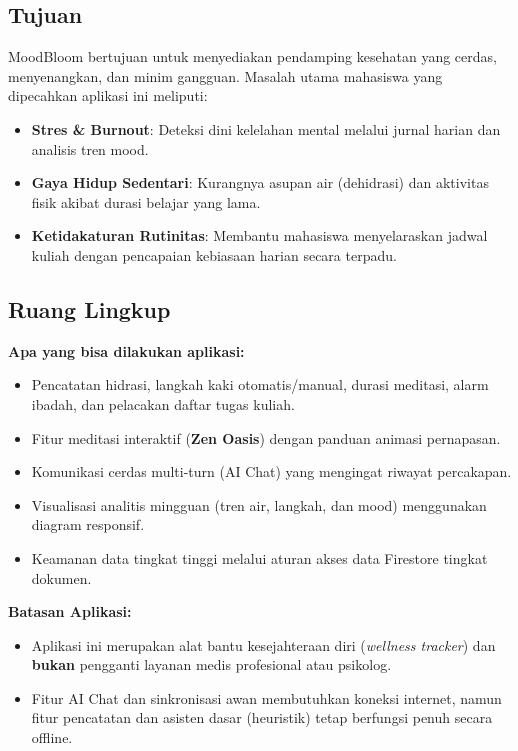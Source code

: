 \documentclass[12pt,a4paper]{article}
\begin{document}
\subsection{Tujuan}
MoodBloom bertujuan untuk menyediakan pendamping kesehatan yang cerdas, menyenangkan, dan minim gangguan. Masalah utama mahasiswa yang dipecahkan aplikasi ini meliputi:
\begin{itemize}
    \item \textbf{Stres \& Burnout}: Deteksi dini kelelahan mental melalui jurnal harian dan analisis tren mood.
    \item \textbf{Gaya Hidup Sedentari}: Kurangnya asupan air (dehidrasi) dan aktivitas fisik akibat durasi belajar yang lama.
    \item \textbf{Ketidakaturan Rutinitas}: Membantu mahasiswa menyelaraskan jadwal kuliah dengan pencapaian kebiasaan harian secara terpadu.
\end{itemize}

\subsection{Ruang Lingkup}
\textbf{Apa yang bisa dilakukan aplikasi:}
\begin{itemize}
    \item Pencatatan hidrasi, langkah kaki otomatis/manual, durasi meditasi, alarm ibadah, dan pelacakan daftar tugas kuliah.
    \item Fitur meditasi interaktif (\textbf{Zen Oasis}) dengan panduan animasi pernapasan.
    \item Komunikasi cerdas multi-turn (AI Chat) yang mengingat riwayat percakapan.
    \item Visualisasi analitis mingguan (tren air, langkah, dan mood) menggunakan diagram responsif.
    \item Keamanan data tingkat tinggi melalui aturan akses data Firestore tingkat dokumen.
\end{itemize}
\textbf{Batasan Aplikasi:}
\begin{itemize}
    \item Aplikasi ini merupakan alat bantu kesejahteraan diri (\textit{wellness tracker}) dan \textbf{bukan} pengganti layanan medis profesional atau psikolog.
    \item Fitur AI Chat dan sinkronisasi awan membutuhkan koneksi internet, namun fitur pencatatan dan asisten dasar (heuristik) tetap berfungsi penuh secara offline.
\end{itemize}
\end{document}

